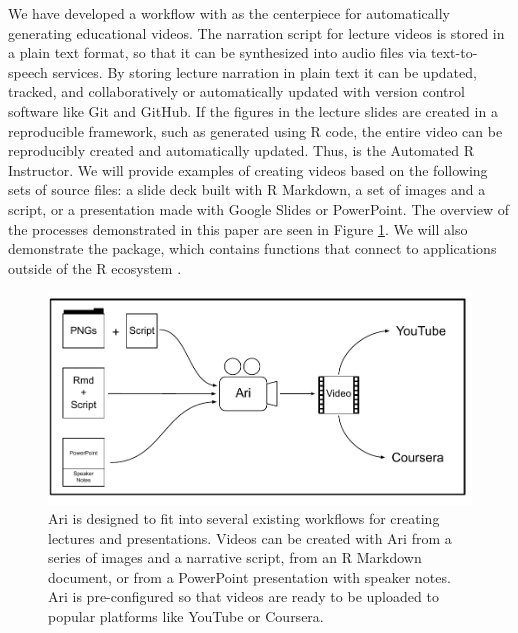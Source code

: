 We have developed a workflow with  as the centerpiece for
automatically generating educational videos. The narration script for
lecture videos is stored in a plain text format, so that it can be
synthesized into audio files via text-to-speech services. By storing
lecture narration in plain text it can be updated, tracked, and
collaboratively or automatically updated with version control software
like Git and GitHub. If the figures in the lecture slides are created in
a reproducible framework, such as generated using R code, the entire
video can be reproducibly created and automatically updated. Thus,
 is the Automated R Instructor. We will provide examples of
creating videos based on the following sets of source files: a slide
deck built with R Markdown, a set of images and a script, or a
presentation made with Google Slides or PowerPoint. The overview of the
processes demonstrated in this paper are seen in Figure \ref{fig:fig1}.
We will also demonstrate the  package, which contains
functions that connect  to applications outside of the R
ecosystem \citep{ariExtra}.

\begin{Schunk}
\begin{figure}
\includegraphics[width=1\linewidth]{Figure-1-Ari-pdf} \caption[Ari is designed to fit into several existing workflows for creating lectures and presentations]{Ari is designed to fit into several existing workflows for creating lectures and presentations. Videos can be created with Ari from a series of images and a narrative script, from an R Markdown document, or from a PowerPoint presentation with speaker notes. Ari is pre-configured so that videos are ready to be uploaded to popular platforms like YouTube or Coursera.}\label{fig:fig1}
\end{figure}
\end{Schunk}

